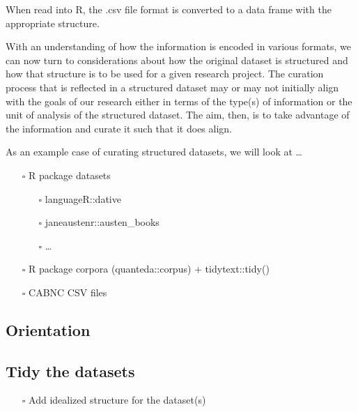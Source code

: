 \documentclass[
  letterpaper,
  DIV=11,
  numbers=noendperiod]{scrreport}
\providecommand{\tightlist}{%
  \setlength{\itemsep}{0pt}\setlength{\parskip}{0pt}}\usepackage{longtable,booktabs,array}
\theoremstyle{definition}
\theoremstyle{remark}
\begin{document}
When read into R, the .csv file format is converted to a data frame with
the appropriate structure.

\begin{table}

\end{table}

With an understanding of how the information is encoded in various
formats, we can now turn to considerations about how the original
dataset is structured and how that structure is to be used for a given
research project. The curation process that is reflected in a structured
dataset may or may not initially align with the goals of our research
either in terms of the type(s) of information or the unit of analysis of
the structured dataset. The aim, then, is to take advantage of the
information and curate it such that it does align.

As an example case of curating structured datasets, we will look at
\ldots{}

\begin{itemize}
\tightlist
\item[$\square$]
  R package datasets

  \begin{itemize}
  \tightlist
  \item[$\square$]
    languageR::dative
  \item[$\square$]
    janeaustenr::austen\_books
  \item[$\square$]
    \ldots{}
  \end{itemize}
\item[$\square$]
  R package corpora (quanteda::corpus) + tidytext::tidy()
\item[$\square$]
  CABNC CSV files
\end{itemize}

\hypertarget{orientation-1}{%
\subsection{Orientation}\label{orientation-1}}

\hypertarget{tidy-the-datasets}{%
\subsection{Tidy the datasets}\label{tidy-the-datasets}}

\begin{itemize}
\tightlist
\item[$\square$]
  Add idealized structure for the dataset(s)
\end{itemize}
\end{document}
